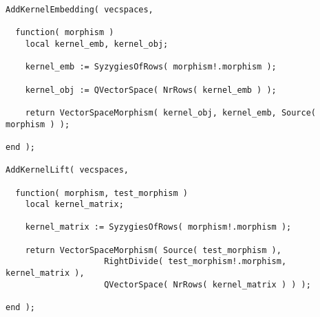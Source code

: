 \begin{small}
\begin{Verbatim}[frame=single]
AddKernelEmbedding( vecspaces,

  function( morphism )
    local kernel_emb, kernel_obj;
    
    kernel_emb := SyzygiesOfRows( morphism!.morphism );
    
    kernel_obj := QVectorSpace( NrRows( kernel_emb ) );
    
    return VectorSpaceMorphism( kernel_obj, kernel_emb, Source( morphism ) );
    
end );

AddKernelLift( vecspaces,

  function( morphism, test_morphism )
    local kernel_matrix;
    
    kernel_matrix := SyzygiesOfRows( morphism!.morphism );

    return VectorSpaceMorphism( Source( test_morphism ),
                    RightDivide( test_morphism!.morphism, kernel_matrix ),
                    QVectorSpace( NrRows( kernel_matrix ) ) );
    
end );
\end{Verbatim}
\end{small}